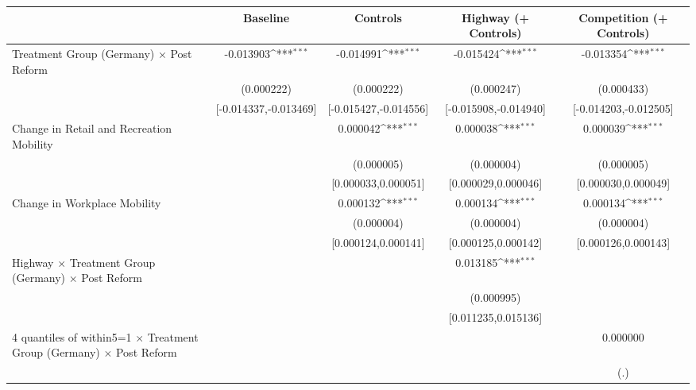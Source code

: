{
\def\sym#1{\ifmmode^{#1}\else\(^{#1}\)\fi}
\begin{tabular}{l*{4}{c}}
\toprule
                    &\multicolumn{1}{c}{Baseline}&\multicolumn{1}{c}{Controls}&\multicolumn{1}{c}{Highway (+ Controls)}&\multicolumn{1}{c}{Competition (+ Controls)}\\
\midrule
Treatment Group (Germany) $\times$ Post Reform&   -0.013903\sym{***}&   -0.014991\sym{***}&   -0.015424\sym{***}&   -0.013354\sym{***}\\
                    &  (0.000222)         &  (0.000222)         &  (0.000247)         &  (0.000433)         \\
                    &[-0.014337,-0.013469]         &[-0.015427,-0.014556]         &[-0.015908,-0.014940]         &[-0.014203,-0.012505]         \\
Change in Retail and Recreation Mobility&                     &    0.000042\sym{***}&    0.000038\sym{***}&    0.000039\sym{***}\\
                    &                     &  (0.000005)         &  (0.000004)         &  (0.000005)         \\
                    &                     &[0.000033,0.000051]         &[0.000029,0.000046]         &[0.000030,0.000049]         \\
Change in Workplace Mobility&                     &    0.000132\sym{***}&    0.000134\sym{***}&    0.000134\sym{***}\\
                    &                     &  (0.000004)         &  (0.000004)         &  (0.000004)         \\
                    &                     &[0.000124,0.000141]         &[0.000125,0.000142]         &[0.000126,0.000143]         \\
Highway $\times$ Treatment Group (Germany) $\times$ Post Reform&                     &                     &    0.013185\sym{***}&                     \\
                    &                     &                     &  (0.000995)         &                     \\
                    &                     &                     &[0.011235,0.015136]         &                     \\
4 quantiles of within5=1 $\times$ Treatment Group (Germany) $\times$ Post Reform&                     &                     &                     &    0.000000         \\
                    &                     &                     &                     &         (.)         \\

\end{tabular}}
